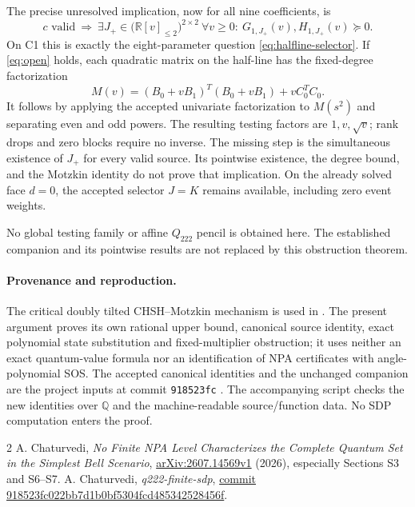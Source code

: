 \documentclass[11pt]{article}
\newcommand{\R}{\mathbb R}
\begin{document}
The precise unresolved implication, now for all nine coefficients, is
\begin{equation}\label{eq:open}
\boxed{c\text{ valid}\ \Longrightarrow\
\exists J_+\in\bigl(\R[v]_{\leq2}\bigr)^{2\times2}\ 
\forall v\geq0:\ G_{1,J_+}(v),H_{1,J_+}(v)\succeq0.}
\end{equation}
On C1 this is exactly the eight-parameter question \eqref{eq:halfline-selector}.
If \eqref{eq:open} holds, each quadratic matrix on the half-line has the
fixed-degree factorization
\[
M(v)=(B_0+vB_1)^T(B_0+vB_1)+vC_0^TC_0.
\]
It follows by applying the accepted univariate factorization to $M(s^2)$
and separating even and odd powers. The resulting testing factors are
$1,v,\sqrt v$; rank drops and zero blocks require no inverse.
The missing step is the simultaneous existence of $J_+$ for every valid
source. Its pointwise existence, the degree bound, and the Motzkin identity
do not prove that implication. On the already solved face $d=0$, the
accepted selector $J=K$ remains available, including zero event weights.

No global testing family or affine $Q_{222}$ pencil is obtained here.
The established companion and its pointwise results are not replaced by
this obstruction theorem.
\paragraph{Provenance and reproduction.}
The critical doubly tilted CHSH--Motzkin mechanism is used in
\cite{Chaturvedi}. The present argument proves its own rational upper bound,
canonical source identity, exact polynomial state substitution and
fixed-multiplier obstruction; it uses neither an exact quantum-value formula
nor an identification of NPA certificates with angle-polynomial SOS.
The accepted canonical identities and the unchanged companion are the
project inputs at commit \texttt{918523fc} \cite{Project}.
The accompanying script checks the new identities over $\mathbb Q$ and the
machine-readable source/function data. No SDP computation enters the proof.

\begin{thebibliography}{2}\small
{} A. Chaturvedi, \emph{No Finite NPA Level Characterizes
the Complete Quantum Set in the Simplest Bell Scenario},
\href{https://arxiv.org/abs/2607.14569}{arXiv:2607.14569v1} (2026),
especially Sections S3 and S6--S7.
\bibitem{Project} A. Chaturvedi, \emph{q222-finite-sdp},
\href{https://github.com/anubhav70747/q222-finite-sdp/tree/918523fc022bb7d1b0bf5304fcd485342528456f}{commit 918523fc022bb7d1b0bf5304fcd485342528456f}.
\end{thebibliography}
\end{document}
